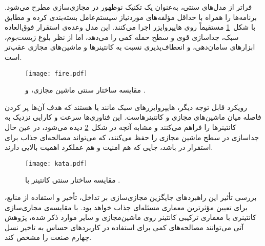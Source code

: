 فراتر از مدل‌های سنتی،  به‌عنوان یک تکنیک نوظهور در مجازی‌سازی مطرح می‌شود.  برنامه‌ها را همراه با حداقل مؤلفه‌های موردنیاز سیستم‌عامل بسته‌بندی کرده و مطابق با شکل~\ref{figure:fireVuni} مستقیماً روی هایپروایزر اجرا می‌کنند\cite{firecracker2018}. این مدل وعده‌ی استقرار فوق‌العاده سبک، جداسازی قوی و سطح حمله‌ کمی را می‌دهد، اما از نظر بلوغ زیست‌بوم، ابزارهای سامان‌دهی، و انعطاف‌پذیری نسبت به کانتینرها و ماشین‌های مجازی عقب‌تر است.

\vspace{0.5cm}
\begin{figure}[h]
\centering
\texttt{[image: fire.pdf]}
\caption{مقایسه ساختار سنتی ماشین مجازی،  و \cite{firecracker2018}.}
\label{figure:fireVuni}
\end{figure}
\vspace{0.5cm}

رویکرد قابل توجه دیگر، هایپروایزرهای سبک مانند  یا  هستند که هدف آن‌ها پر کردن فاصله میان ماشین‌های مجازی و کانتینرهاست. این فناوری‌ها سرعت و کارایی نزدیک به کانتینرها را فراهم می‌کنند و مشابه آنچه در شکل~\ref{figure:containerVkata} دیده می‌شود، در عین حال جداسازی در سطح ماشین مجازی را حفظ می‌کنند\cite{kata2019}، که می‌تواند مصالحه‌ای جذاب برای استقرار در  باشد، جایی که هم امنیت و هم عملکرد اهمیت بالایی دارند.

\vspace{0.5cm}
\begin{figure}[h]
\centering
\texttt{[image: kata.pdf]}
\caption{مقایسه ساختار سنتی کانتینر با \cite{kata2019}.}
\label{figure:containerVkata}
\end{figure}
\vspace{0.5cm}

بررسی تأثیر این راهبردهای جایگزین مجازی‌سازی بر تداخل، تأخیر و استفاده از منابع، برای تعیین مؤثرترین معماری مسئله‌ای جذاب خواهد بود. با مقایسه‌ی مجازی‌سازی کانتینری با معماری ترکیبی کانتینر روی ماشین‌مجازی و سایر موارد ذکر شده، پژوهش‌ آتی می‌توانند مصالحه‌های کمی برای استفاده در کاربردهای حساس به تاخیر نسل چهارم صنعت را مشخص کند.